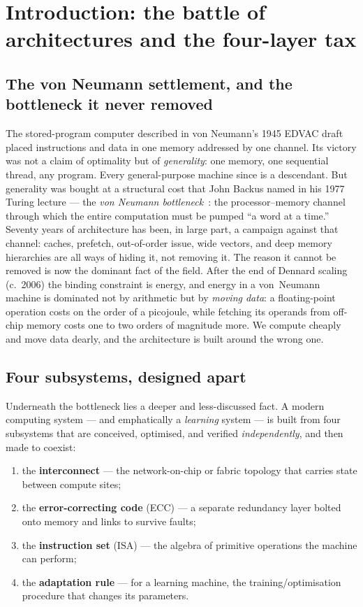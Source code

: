 \section{Introduction: the battle of architectures and the four-layer tax}
\label{sec:intro}

\subsection{The von Neumann settlement, and the bottleneck it never removed}

The stored-program computer described in von Neumann's 1945 EDVAC draft
placed instructions and data in one memory addressed by one channel. Its
victory was not a claim of optimality but of \emph{generality}: one memory,
one sequential thread, any program. Every general-purpose machine since is a
descendant. But generality was bought at a structural cost that John Backus
named in his 1977 Turing lecture --- the \emph{von Neumann
bottleneck}~\cite{backus1977}: the processor--memory channel through which
the entire computation must be pumped ``a word at a time.'' Seventy years of
architecture has been, in large part, a campaign against that channel:
caches, prefetch, out-of-order issue, wide vectors, and deep memory
hierarchies are all ways of hiding it, not removing it. The reason it cannot
be removed is now the dominant fact of the field. After the end of Dennard
scaling (c.\ 2006) the binding constraint is energy, and energy in a
von~Neumann machine is dominated not by arithmetic but by \emph{moving
data}: a floating-point operation costs on the order of a picojoule, while
fetching its operands from off-chip memory costs one to two orders of
magnitude more. We compute cheaply and move data dearly, and the
architecture is built around the wrong one.

\subsection{Four subsystems, designed apart}

Underneath the bottleneck lies a deeper and less-discussed fact. A modern
computing system --- and emphatically a \emph{learning} system --- is built
from four subsystems that are conceived, optimised, and verified
\emph{independently}, and then made to coexist:

\begin{enumerate}[leftmargin=1.7em,itemsep=1pt]
  \item the \textbf{interconnect} --- the network-on-chip or fabric topology
        that carries state between compute sites;
  \item the \textbf{error-correcting code} (ECC) --- a separate redundancy
        layer bolted onto memory and links to survive faults;
  \item the \textbf{instruction set} (ISA) --- the algebra of primitive
        operations the machine can perform;
  \item the \textbf{adaptation rule} --- for a learning machine, the
        training/optimisation procedure that changes its parameters.
\end{enumerate}

